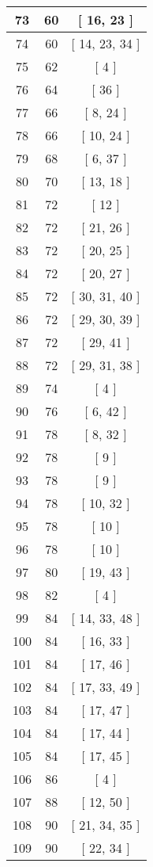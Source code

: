 \begin{center}
\begin{longtable}[H]{|| c c c ||}
73 & 60 & [ 16, 23 ] \\ 
\hline
74 & 60 & [ 14, 23, 34 ] \\ 
\hline
75 & 62 & [ 4 ] \\ 
\hline
76 & 64 & [ 36 ] \\ 
\hline
77 & 66 & [ 8, 24 ] \\ 
\hline
78 & 66 & [ 10, 24 ] \\ 
\hline
79 & 68 & [ 6, 37 ] \\ 
\hline
80 & 70 & [ 13, 18 ] \\ 
\hline
81 & 72 & [ 12 ] \\ 
\hline
82 & 72 & [ 21, 26 ] \\ 
\hline
83 & 72 & [ 20, 25 ] \\ 
\hline
84 & 72 & [ 20, 27 ] \\ 
\hline
85 & 72 & [ 30, 31, 40 ] \\ 
\hline
86 & 72 & [ 29, 30, 39 ] \\ 
\hline
87 & 72 & [ 29, 41 ] \\ 
\hline
88 & 72 & [ 29, 31, 38 ] \\ 
\hline
89 & 74 & [ 4 ] \\ 
\hline
90 & 76 & [ 6, 42 ] \\ 
\hline
91 & 78 & [ 8, 32 ] \\ 
\hline
92 & 78 & [ 9 ] \\ 
\hline
93 & 78 & [ 9 ] \\ 
\hline
94 & 78 & [ 10, 32 ] \\ 
\hline
95 & 78 & [ 10 ] \\ 
\hline
96 & 78 & [ 10 ] \\ 
\hline
97 & 80 & [ 19, 43 ] \\ 
\hline
98 & 82 & [ 4 ] \\ 
\hline
99 & 84 & [ 14, 33, 48 ] \\ 
\hline
100 & 84 & [ 16, 33 ] \\ 
\hline
101 & 84 & [ 17, 46 ] \\ 
\hline
102 & 84 & [ 17, 33, 49 ] \\ 
\hline
103 & 84 & [ 17, 47 ] \\ 
\hline
104 & 84 & [ 17, 44 ] \\ 
\hline
105 & 84 & [ 17, 45 ] \\ 
\hline
106 & 86 & [ 4 ] \\ 
\hline
107 & 88 & [ 12, 50 ] \\ 
\hline
108 & 90 & [ 21, 34, 35 ] \\ 
\hline
109 & 90 & [ 22, 34 ] \\ 

\end{longtable}
\end{center}
